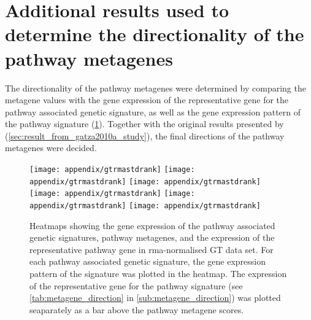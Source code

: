 	\newpage


	\section{Additional results used to determine the directionality of the pathway metagenes}
	\label{sec:additional_results_to_determine_the_directionality_of_the_pathway_metagenes}

	The directionality of the pathway metagenes were determined by comparing the metagene values with the gene expression of the representative gene for the pathway associated genetic signature, as well as the gene expression pattern of the pathway signature (\cref{fig:appendix/gt_pathmeta_rank}).
	Together with the original results presented by \citet{Gatza2010a} (\cref{sec:result_from_gatza2010a_study}), the final directions of the pathway metagenes were decided.

	\begin{figure}[htp!]
		\centering
		\texttt{[image: appendix/gtrmastdrank]}
		\texttt{[image: appendix/gtrmastdrank]}
		\texttt{[image: appendix/gtrmastdrank]}\\
		\texttt{[image: appendix/gtrmastdrank]}
		\texttt{[image: appendix/gtrmastdrank]}
		\texttt{[image: appendix/gtrmastdrank]}\\
		\caption[Directionality of the pathway metagenes in the GT data]{Heatmaps showing the gene expression of the pathway associated genetic signatures, pathway metagenes, and the expression of the representative pathway gene in \gls{rma}-normalised GT data set.
		For each pathway associated genetic signature, the gene expression pattern of the signature was plotted in the heatmap.
		The expression of the representative gene for the pathway signature (see \cref{tab:metagene_direction} in \cref{sub:metagene_direction}) was plotted seaparately as a bar above the pathway metagene scores.
		}
		\label{fig:appendix/gt_pathmeta_rank}
	\end{figure}

